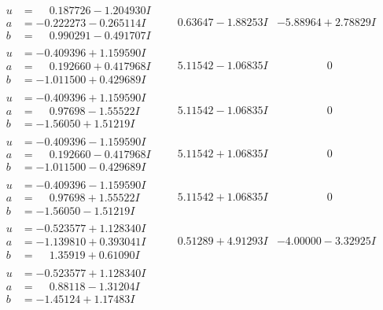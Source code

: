 \documentclass[1p]{elsarticle_modified}
\theoremstyle{definition}
\begin{document}
$$\begin{array}{c|c|c}
\begin{aligned}
u &= \phantom{-}0.187726 - 1.204930 I \\
a &= -0.222273 - 0.265114 I \\
b &= \phantom{-}0.990291 - 0.491707 I\end{aligned}
 & \phantom{-}0.63647 - 1.88253 I & -5.88964 + 2.78829 I \\ \hline\begin{aligned}
u &= -0.409396 + 1.159590 I \\
a &= \phantom{-}0.192660 + 0.417968 I \\
b &= -1.011500 + 0.429689 I\end{aligned}
 & \phantom{-}5.11542 - 1.06835 I & \phantom{-0.000000 } 0 \\ \hline\begin{aligned}
u &= -0.409396 + 1.159590 I \\
a &= \phantom{-}0.97698 - 1.55522 I \\
b &= -1.56050 + 1.51219 I\end{aligned}
 & \phantom{-}5.11542 - 1.06835 I & \phantom{-0.000000 } 0 \\ \hline\begin{aligned}
u &= -0.409396 - 1.159590 I \\
a &= \phantom{-}0.192660 - 0.417968 I \\
b &= -1.011500 - 0.429689 I\end{aligned}
 & \phantom{-}5.11542 + 1.06835 I & \phantom{-0.000000 } 0 \\ \hline\begin{aligned}
u &= -0.409396 - 1.159590 I \\
a &= \phantom{-}0.97698 + 1.55522 I \\
b &= -1.56050 - 1.51219 I\end{aligned}
 & \phantom{-}5.11542 + 1.06835 I & \phantom{-0.000000 } 0 \\ \hline\begin{aligned}
u &= -0.523577 + 1.128340 I \\
a &= -1.139810 + 0.393041 I \\
b &= \phantom{-}1.35919 + 0.61090 I\end{aligned}
 & \phantom{-}0.51289 + 4.91293 I & -4.00000 - 3.32925 I \\ \hline\begin{aligned}
u &= -0.523577 + 1.128340 I \\
a &= \phantom{-}0.88118 - 1.31204 I \\
b &= -1.45124 + 1.17483 I\end{aligned}

\end{array}$$
\end{document}
